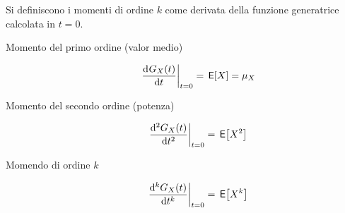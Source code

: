 Si definiscono i momenti di ordine $k$ come derivata della funzione generatrice calcolata in $t=0$.

\begin{description}
\item[Momento del primo ordine (valor medio)]
\begin{equation}
	\restrict{\deriv{G_X(t)}{t}}{t=0}=\E{X}=\mu_X
\end{equation}
\item[Momento del secondo ordine (potenza)]
\begin{equation}
	\restrict{\deriv[2]{G_X(t)}{t}}{t=0}=\E{X^2}
\end{equation}
\item[Momendo di ordine $k$]
\begin{equation}
	\restrict{\deriv[k]{G_X(t)}{t}}{t=0}=\E{X^k}
\end{equation}
\end{description}

